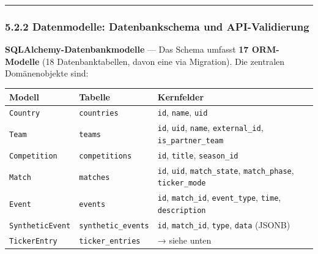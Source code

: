 \begin{center}\rule{0.5\linewidth}{0.5pt}\end{center}

\subsubsection{5.2.2 Datenmodelle: Datenbankschema und
API-Validierung}\label{datenmodelle-datenbankschema-und-api-validierung}

\textbf{SQLAlchemy-Datenbankmodelle} --- Das Schema umfasst \textbf{17
ORM-Modelle} (18 Datenbanktabellen, davon eine via Migration). Die
zentralen Domänenobjekte sind:

{\def\LTcaptype{none} %
\begin{longtable}[]{@{}
  >{\raggedright\arraybackslash}p{}
  >{\raggedright\arraybackslash}p{}
  >{\raggedright\arraybackslash}p{}@{}}
\toprule\noalign{}
\begin{minipage}[b]{\linewidth}\raggedright
Modell
\end{minipage} & \begin{minipage}[b]{\linewidth}\raggedright
Tabelle
\end{minipage} & \begin{minipage}[b]{\linewidth}\raggedright
Kernfelder
\end{minipage} \\
\midrule\noalign{}
\endhead
\bottomrule\noalign{}
\endlastfoot
\texttt{Country} & \texttt{countries} & \texttt{id}, \texttt{name},
\texttt{uid} \\
\texttt{Team} & \texttt{teams} & \texttt{id}, \texttt{uid},
\texttt{name}, \texttt{external\_id}, \texttt{is\_partner\_team} \\
\texttt{Competition} & \texttt{competitions} & \texttt{id},
\texttt{title}, \texttt{season\_id} \\
\texttt{Match} & \texttt{matches} & \texttt{id}, \texttt{uid},
\texttt{match\_state}, \texttt{match\_phase}, \texttt{ticker\_mode} \\
\texttt{Event} & \texttt{events} & \texttt{id}, \texttt{match\_id},
\texttt{event\_type}, \texttt{time}, \texttt{description} \\
\texttt{SyntheticEvent} & \texttt{synthetic\_events} & \texttt{id},
\texttt{match\_id}, \texttt{type}, \texttt{data} (JSONB) \\
\texttt{TickerEntry} & \texttt{ticker\_entries} & → siehe unten \\

\end{longtable}}
